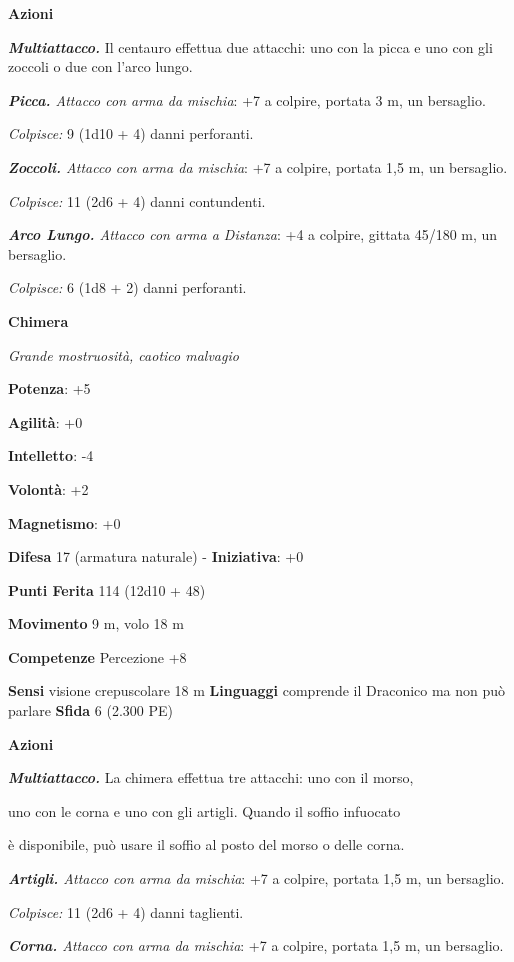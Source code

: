 \begin{multicols}{2}
\textbf{Azioni}

\emph{\textbf{Multiattacco.}} Il centauro effettua due attacchi: uno con
la picca e uno con gli zoccoli o due con l'arco lungo.

\emph{\textbf{Picca.} Attacco con arma da mischia}: +7 a colpire,
portata 3 m, un bersaglio.

\emph{Colpisce:} 9 (1d10 + 4) danni perforanti.

\emph{\textbf{Zoccoli.} Attacco con arma da mischia}: +7 a colpire,
portata 1,5 m, un bersaglio.

\emph{Colpisce:} 11 (2d6 + 4) danni contundenti.

\emph{\textbf{Arco Lungo.} Attacco con arma a Distanza}: +4 a colpire,
gittata 45/180 m, un bersaglio.

\emph{Colpisce:} 6 (1d8 + 2) danni perforanti.



\textbf{Chimera}

\emph{Grande mostruosità, caotico malvagio}

\textbf{Potenza}: +5

\textbf{Agilità}: +0

\textbf{Intelletto}: -4

\textbf{Volontà}: +2

\textbf{Magnetismo}: +0

\textbf{Difesa} 17 (armatura naturale) - \textbf{Iniziativa}: +0

\textbf{Punti Ferita} 114 (12d10 + 48)

\textbf{Movimento} 9 m, volo 18 m

\textbf{Competenze} Percezione +8

\textbf{Sensi} visione crepuscolare 18 m
\textbf{Linguaggi} comprende il Draconico ma non può parlare
\textbf{Sfida} 6 (2.300 PE)

\textbf{Azioni}

\emph{\textbf{Multiattacco.}} La chimera effettua tre attacchi: uno con
il morso,

uno con le corna e uno con gli artigli. Quando il soffio infuocato

è disponibile, può usare il soffio al posto del morso o delle corna.

\emph{\textbf{Artigli.} Attacco con arma da mischia}: +7 a colpire,
portata 1,5 m, un bersaglio.

\emph{Colpisce:} 11 (2d6 + 4) danni taglienti.

\emph{\textbf{Corna.} Attacco con arma da mischia}: +7 a colpire,
portata 1,5 m, un bersaglio.


\end{multicols}
